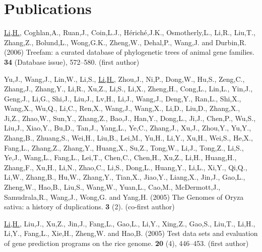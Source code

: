 \chapter{Publications}

{
\setlength{\parindent}{0pt}
\setlength{\parskip}{1.2ex plus 0.5ex minus 0.2ex}

\underline{Li,H.}, Coghlan,A., Ruan,J., Coin,L.J., H{\'e}rich{\'e},J.K., Osmotherly,L.,
  Li,R., Liu,T., Zhang,Z., Bolund,L., Wong,G.K., Zheng,W., Dehal,P., Wang,J.
  and Durbin,R. (2006{\em{}}) Treefam: a curated database of phylogenetic trees
  of animal gene families.
 {\bf 34} (Database issue), 572--580. (first author)

Yu,J., Wang,J., Lin,W., Li,S., \underline{Li,H.}, Zhou,J., Ni,P., Dong,W., Hu,S., Zeng,C.,
  Zhang,J., Zhang,Y., Li,R., Xu,Z., Li,S., Li,X., Zheng,H., Cong,L., Lin,L.,
  Yin,J., Geng,J., Li,G., Shi,J., Liu,J., Lv,H., Li,J., Wang,J., Deng,Y.,
  Ran,L., Shi,X., Wang,X., Wu,Q., Li,C., Ren,X., Wang,J., Wang,X., Li,D.,
  Liu,D., Zhang,X., Ji,Z., Zhao,W., Sun,Y., Zhang,Z., Bao,J., Han,Y., Dong,L.,
  Ji,J., Chen,P., Wu,S., Liu,J., Xiao,Y., Bu,D., Tan,J., Yang,L., Ye,C.,
  Zhang,J., Xu,J., Zhou,Y., Yu,Y., Zhang,B., Zhuang,S., Wei,H., Liu,B., Lei,M.,
  Yu,H., Li,Y., Xu,H., Wei,S., He,X., Fang,L., Zhang,Z., Zhang,Y., Huang,X.,
  Su,Z., Tong,W., Li,J., Tong,Z., Li,S., Ye,J., Wang,L., Fang,L., Lei,T.,
  Chen,C., Chen,H., Xu,Z., Li,H., Huang,H., Zhang,F., Xu,H., Li,N., Zhao,C.,
  Li,S., Dong,L., Huang,Y., Li,L., Xi,Y., Qi,Q., Li,W., Zhang,B., Hu,W.,
  Zhang,Y., Tian,X., Jiao,Y., Liang,X., Jin,J., Gao,L., Zheng,W., Hao,B.,
  Liu,S., Wang,W., Yuan,L., Cao,M., McDermott,J., Samudrala,R., Wang,J.,
  Wong,G.  and Yang,H. (2005{\em{}}) {The Genomes of Oryza sativa: a history of
  duplications}.
 {\bf 3} (2). (co-first author)

\underline{Li,H.}, Liu,J., Xu,Z., Jin,J., Fang,L., Gao,L., Li,Y., Xing,Z., Gao,S., Liu,T.,
  Li,H., Li,Y., Fang,L., Xie,H., Zheng,W.  and Hao,B. (2005{\em{}}) {Test data
  sets and evaluation of gene prediction programs on the rice genome}.
 {\bf 20} (4), 446--453. (first author)

}
